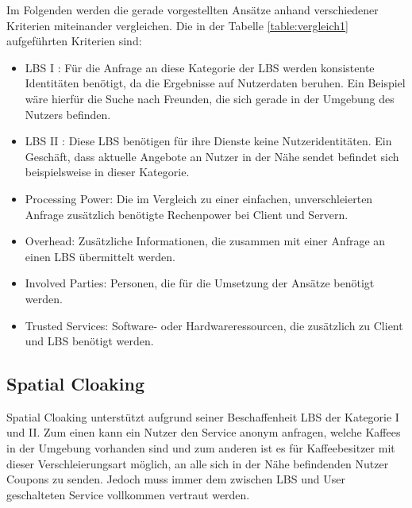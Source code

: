 Im Folgenden werden die gerade vorgestellten Ansätze anhand verschiedener Kriterien miteinander vergleichen. Die in der Tabelle \ref{table:vergleich1} aufgeführten Kriterien sind:
\begin{itemize}
	\item LBS I \cite{Chow2011}: Für die Anfrage an diese Kategorie der LBS werden konsistente Identitäten benötigt, da die Ergebnisse auf Nutzerdaten beruhen. Ein Beispiel wäre hierfür die Suche nach Freunden, die sich gerade in der Umgebung des Nutzers befinden.
	\item LBS II \cite{Chow2011}: Diese LBS benötigen für ihre Dienste keine Nutzeridentitäten. Ein Geschäft, dass aktuelle Angebote an Nutzer in der Nähe sendet befindet sich beispielsweise in dieser Kategorie.
	\item Processing Power: Die im Vergleich zu einer einfachen, unverschleierten Anfrage zusätzlich benötigte Rechenpower bei Client und Servern.
	\item Overhead: Zusätzliche Informationen, die zusammen mit einer Anfrage an einen LBS übermittelt werden.
	\item Involved Parties: Personen, die für die Umsetzung der Ansätze benötigt werden.
	\item Trusted Services: Software- oder Hardwareressourcen, die zusätzlich zu Client und LBS benötigt werden.
\end{itemize}

\subsection{Spatial Cloaking}
Spatial Cloaking unterstützt aufgrund seiner Beschaffenheit LBS der Kategorie I und II. Zum einen kann ein Nutzer den Service anonym anfragen, welche Kaffees in der Umgebung vorhanden sind und zum anderen ist es für Kaffeebesitzer mit dieser Verschleierungsart möglich, an alle sich in der Nähe befindenden Nutzer Coupons zu senden. Jedoch muss immer dem zwischen LBS und User geschalteten Service vollkommen vertraut werden.

